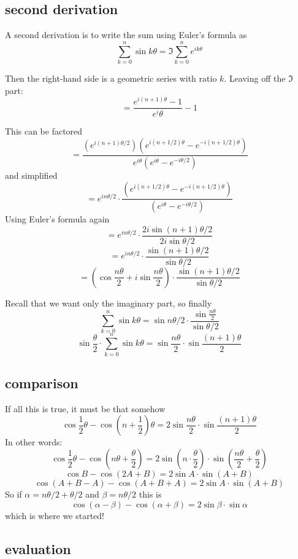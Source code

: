 \documentclass[11pt, oneside]{article}
\begin{document}
\subsection*{second derivation}

A second derivation is to write the sum using Euler's formula as
\[ \sum_{k=0}^n \sin k \theta = \Im {\sum_{k=0}^n e^{ik \theta} } \]

Then the right-hand side is a geometric series with ratio $k$.  Leaving off the $\Im$ part:
\[ = \frac {e^{i(n+1) \theta} - 1} {e^i \theta} - 1 \]

This can be factored
\[ = \frac {(e^{i(n+1) \theta/2})(e^{i(n+1/2) \theta} - e^{-i(n+1/2) \theta})} {e^{i \theta} (e^{i \theta} - e^{-i \theta/2})} \]
and simplified
\[ = e^{in \theta/2} \cdot \frac {(e^{i(n+1/2) \theta} - e^{-i(n+1/2) \theta})} {(e^{i \theta} - e^{-i \theta/2})} \]
Using Euler's formula again 
\[ = e^{in \theta/2} \cdot \frac {2i \sin (n+1) \theta/2} {2i \sin \theta/2 } \]
\[ = e^{in \theta/2} \cdot \frac {\sin (n+1) \theta/2} {\sin \theta/2 } \]
\[ = (\cos \frac {n \theta} 2 + i \sin \frac {n \theta} 2 ) \cdot \frac {\sin (n+1) \theta/2} {\sin \theta/2 } \]

Recall that we want only the imaginary part, so finally
\[ \sum_{k=0}^n \sin k \theta =  \sin n \theta/2 \cdot \frac {\sin \frac {n \theta} 2} {\sin \theta/2 } \]
\[ \sin \frac \theta 2 \cdot \sum_{k=0}^n \sin k \theta =  \sin \frac {n \theta} 2 \cdot \sin \frac {(n+1) \theta} 2  \]

\subsection*{comparison}
If all this is true, it must be that somehow
\[ \cos {\frac 1 2} \theta  - \cos (n +  {\frac 1 2}) \theta =  2 \sin \frac {n \theta} 2 \cdot \sin \frac {(n+1) \theta} 2  \]
In other words:
\[ \cos {\frac 1 2} \theta  - \cos (n \theta +  \frac \theta 2) =  2 \sin (n \cdot \frac \theta 2) \cdot \sin (\frac {n \theta} 2 + \frac \theta 2)  \]
\[ \cos B - \cos (2A + B) = 2 \sin A \cdot \sin (A + B)  \]
\[ \cos (A+B - A) - \cos (A + B + A)  = 2 \sin A \cdot \sin (A + B) \]
So if $\alpha = n \theta/2 + \theta/2$ and $\beta = n \theta/2$ this is
\[ \cos (\alpha - \beta) - \cos (\alpha + \beta) = 2 \sin \beta \cdot \sin \alpha \]
which is where we started!

\subsection*{evaluation}
\end{document}
